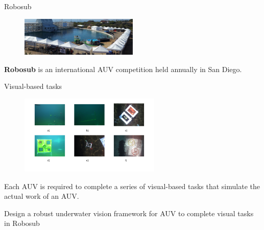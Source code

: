 \documentclass[14pt]{beamer}
\begin{document}
\begin{frame}{Robosub}

  \begin{figure}[ht]
      \centering
      \includegraphics[width=0.5\textwidth, height=0.3\textwidth]{figs/robosub.jpg}
  \end{figure}

  \textbf{Robosub} is an international AUV competition held annually in San Diego.

\end{frame}

\begin{frame}{Visual-based tasks}

  \begin{figure}[ht]
      \centering
      \includegraphics[width=0.6\textwidth, height=0.4\textwidth]{figs/tasks.png}
  \end{figure}

  Each AUV is required to complete a series of visual-based tasks that simulate
  the actual work of an AUV.

\end{frame}

\begin{frame}[standout]{}
  Design a robust underwater vision framework for AUV to complete visual tasks
  in Robosub
\end{frame}
\end{document}
